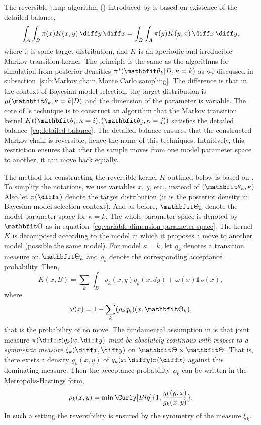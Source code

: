 \documentclass[11pt, hyper, bib, fontset=Minion]{marticle}
\begin{document}
The reversible jump \mcmc algorithm (\rjmcmc) introduced by
\textcite{Green:1995dg} is based on existence of the detailed balance,
\begin{equation}
  \int_A\int_B\pi(x)K(x,y)\intd y \intd x =
  \int_B\int_A\pi(y)K(y,x)\intd x \intd y,
  \label{eq:detailed balance}
\end{equation}
where $\pi$ is some target distribution, and $K$ is an aperiodic and
irreducible Markov transition kernel. The principle is the same as the \mcmc
algorithms for simulation from posterior densities $\pi^*(\bth_k|D,\kappa =
k)$ as we discussed in subsection~\ref{sub:Markov chain Monte Carlo sampling}.
The difference is that in the context of Bayesian model selection, the target
distribution is $\mu(\bth_k,\kappa = k|D)$ and the dimension of the parameter
is variable. The core of \textcite{Green:1995dg}'s technique is to construct
an algorithm that the Markov transition kernel $K((\bth_i,\kappa = i),
(\bth_j,\kappa = j))$ satisfies the detailed balance~\eqref{eq:detailed
  balance}. The detailed balance ensures that the constructed Markov chain is
reversible, hence the name of this techniques. Intuitively, this restriction
ensures that after the sample moves from one model parameter space to another,
it can move back equally.

The method for constructing the reversible kernel $K$ outlined below is based
on \textcite[][chap.~11]{Robert:2004tn}. To simplify the notations, we use
variables $x$, $y$, etc., instead of $(\bth_{\kappa}, \kappa)$. Also let
$\pi(\diff x)$ denote the target distribution (it is the posterior density in
Bayesian model selection context). And as before, $\bTh_k$ denote the model
parameter space for $\kappa = k$. The whole parameter space is denoted by
$\bTh$ as in equation~\eqref{eq:variable dimension parameter space}. The
kernel $K$ is decomposed according to the model in which it proposes a move to
another model (possible the same model). For model $\kappa=k$, let $q_k$
denotes a transition measure on $\bTh_k$ and $\rho_k$ denote the corresponding
acceptance probability. Then,
\begin{equation}
  K(x,B) = \sum_k\int_B\rho_k(x,y)q_k(x,dy)+\omega(x)\mathbb{1}_B(x),
\end{equation}
where
\begin{equation}
  \omega(x) = 1 - \sum_k(\rho_k q_k)(x,\bTh_k),
\end{equation}
that is the probability of no move. The fundamental assumption in
\textcite{Green:1995dg} is that joint measure $\pi(\diff x)q_k(x,\diff y)$
\emph{must be absolutely continous with respect to a symmetric measure}
$\xi_k(\diff x, \diff y)$ on $\bTh\times\bTh$. That is, there exists a density
$g_k(x,y)$ of $q_k(x,\diff y)\pi(\diff x)$ against this dominating measure.
Then the acceptance probability $\rho_k$ can be written in the
Metropolis-Hastings form,
\begin{equation}
  \rho_k(x,y) = \min\Curly[Big]{1,\frac{g_k(y,x)}{g_k(x,y)}}.
\end{equation}
In such a setting the reversibility is ensured by the symmetry of the measure
$\xi_k$.
\end{document}
